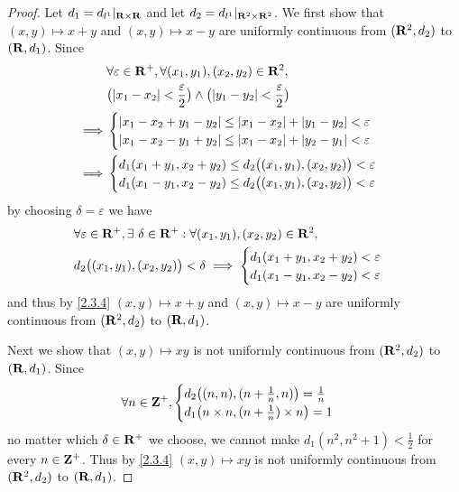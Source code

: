 \begin{proof}
  Let \(d_1 = d_{l^1}|_{\mathbf{R} \times \mathbf{R}}\) and let \(d_2 = d_{l^1}|_{\mathbf{R}^2 \times \mathbf{R}^2}\).
  We first show that \((x, y) \mapsto x + y\) and \((x, y) \mapsto x - y\) are uniformly continuous from \((\mathbf{R}^2, d_2)\) to \((\mathbf{R}, d_1)\).
  Since
  \begin{align*}
             & \forall \varepsilon \in \R^+, \forall (x_1, y_1), (x_2, y_2) \in \R^2,                                    \\
             & \big(\abs{x_1 - x_2} < \frac{\varepsilon}{2}\big) \land \big(\abs{y_1 - y_2} < \frac{\varepsilon}{2}\big) \\
    \implies & \begin{cases}
                 \abs{x_1 - x_2 + y_1 - y_2} \leq \abs{x_1 - x_2} + \abs{y_1 - y_2} < \varepsilon \\
                 \abs{x_1 - x_2 - y_1 + y_2} \leq \abs{x_1 - x_2} + \abs{y_2 - y_1} < \varepsilon \\
               \end{cases}                          \\
    \implies & \begin{cases}
                 d_1(x_1 + y_1, x_2 + y_2) \leq d_2\big((x_1, y_1), (x_2, y_2)\big) < \varepsilon \\
                 d_1(x_1 - y_1, x_2 - y_2) \leq d_2\big((x_1, y_1), (x_2, y_2)\big) < \varepsilon
               \end{cases}
  \end{align*}
  by choosing \(\delta = \varepsilon\) we have
  \begin{align*}
     & \forall \varepsilon \in \mathbf{R}^+, \exists\ \delta \in \mathbf{R}^+ : \forall (x_1, y_1), (x_2, y_2) \in \mathbf{R}^2, \\
     & d_2\big((x_1, y_1), (x_2, y_2)\big) < \delta \implies \begin{cases}
                                                               d_1(x_1 + y_1, x_2 + y_2) < \varepsilon \\
                                                               d_1(x_1 - y_1, x_2 - y_2) < \varepsilon
                                                             \end{cases}
  \end{align*}
  and thus by \cref{2.3.4} \((x, y) \mapsto x + y\) and \((x, y) \mapsto x - y\) are uniformly continuous from \((\mathbf{R}^2, d_2)\) to \((\mathbf{R}, d_1)\).

  Next we show that \((x, y) \mapsto xy\) is not uniformly continuous from \((\mathbf{R}^2, d_2)\) to \((\mathbf{R}, d_1)\).
  Since
  \[
    \forall n \in \mathbf{Z}^+, \begin{cases}
      d_2\big((n, n), (n + \frac{1}{n}, n)\big) = \frac{1}{n} \\
      d_1\big(n \times n, (n + \frac{1}{n}) \times n\big) = 1
    \end{cases}
  \]
  no matter which \(\delta \in \mathbf{R}^+\) we choose, we cannot make \(d_1(n^2, n^2 + 1) < \frac{1}{2}\) for every \(n \in \mathbf{Z}^+\).
  Thus by \cref{2.3.4} \((x, y) \mapsto xy\) is not uniformly continuous from \((\mathbf{R}^2, d_2)\) to \((\mathbf{R}, d_1)\).


\end{proof}
